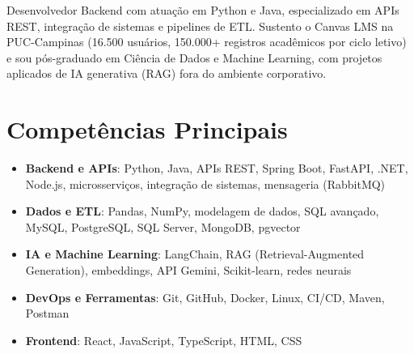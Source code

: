 \documentclass[11pt,a4paper,sans]{moderncv}
\begin{document}
\makecvtitle


\vspace{6pt}
\small{Desenvolvedor Backend com atuação em Python e Java, especializado em APIs REST, integração de sistemas e pipelines de ETL. Sustento o Canvas LMS na PUC-Campinas (16.500 usuários, 150.000+ registros acadêmicos por ciclo letivo) e sou pós-graduado em Ciência de Dados e Machine Learning, com projetos aplicados de IA generativa (RAG) fora do ambiente corporativo.}


\section{Competências Principais}
\vspace{1pt}
\begin{itemize}

\item \textbf{Backend e APIs}: Python, Java, APIs REST, Spring Boot, FastAPI, .NET, Node.js, microsserviços, integração de sistemas, mensageria (RabbitMQ)

\item \textbf{Dados e ETL}: Pandas, NumPy, modelagem de dados, SQL avançado, MySQL, PostgreSQL, SQL Server, MongoDB, pgvector

\item \textbf{IA e Machine Learning}: LangChain, RAG (Retrieval-Augmented Generation), embeddings, API Gemini, Scikit-learn, redes neurais

\item \textbf{DevOps e Ferramentas}: Git, GitHub, Docker, Linux, CI/CD, Maven, Postman

\item \textbf{Frontend}: React, JavaScript, TypeScript, HTML, CSS

\end{itemize}

\end{document}
